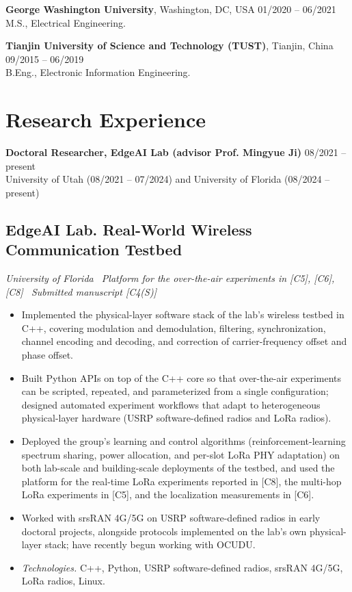 \documentclass[10pt]{article}
\newcommand{\proj}[2]{\subsection*{#1}{\small\itshape #2}\par}
\newcommand{\tech}[1]{\item \textit{Technologies.} #1}
\begin{document}
\textbf{George Washington University}, Washington, DC, USA \hfill 01/2020 -- 06/2021\\
M.S., Electrical Engineering.

\textbf{Tianjin University of Science and Technology (TUST)}, Tianjin, China \hfill 09/2015 -- 06/2019\\
B.Eng., Electronic Information Engineering.

\section*{Research Experience}
\textbf{Doctoral Researcher, EdgeAI Lab (advisor Prof. Mingyue Ji)} \hfill 08/2021 -- present\\
University of Utah (08/2021 -- 07/2024) and University of Florida (08/2024 -- present)

\proj{EdgeAI Lab. Real-World Wireless Communication Testbed}{University of Florida \textbullet\ Platform for the over-the-air experiments in [C5], [C6], [C8] \textbullet\ Submitted manuscript [C4(S)]}
\begin{itemize}
\item Implemented the physical-layer software stack of the lab's wireless testbed in C++, covering modulation and demodulation, filtering, synchronization, channel encoding and decoding, and correction of carrier-frequency offset and phase offset.
\item Built Python APIs on top of the C++ core so that over-the-air experiments can be scripted, repeated, and parameterized from a single configuration; designed automated experiment workflows that adapt to heterogeneous physical-layer hardware (USRP software-defined radios and LoRa radios).
\item Deployed the group's learning and control algorithms (reinforcement-learning spectrum sharing, power allocation, and per-slot LoRa PHY adaptation) on both lab-scale and building-scale deployments of the testbed, and used the platform for the real-time LoRa experiments reported in [C8], the multi-hop LoRa experiments in [C5], and the localization measurements in [C6].
\item Worked with srsRAN 4G/5G on USRP software-defined radios in early doctoral projects, alongside protocols implemented on the lab's own physical-layer stack; have recently begun working with OCUDU.
\tech{C++, Python, USRP software-defined radios, srsRAN 4G/5G, LoRa radios, Linux.}
\end{itemize}
\end{document}
